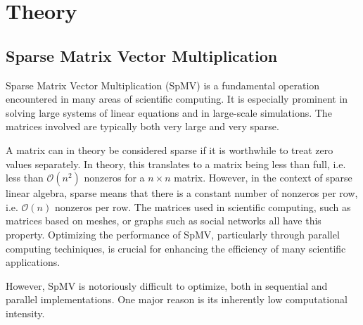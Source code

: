 
\chapter{Theory}

\section{Sparse Matrix Vector Multiplication}
Sparse Matrix Vector Multiplication (SpMV) is a fundamental operation encountered in many areas of scientific computing. It is especially prominent in solving large systems of linear equations and in large-scale simulations. The matrices involved are typically both very large and very sparse. 

A matrix can in theory be considered sparse if it is worthwhile to treat zero values separately. In theory, this translates to a matrix being less than full, i.e. less than \( \mathcal{O}\left(n^2\right)\) nonzeros for a \(n \times  n\) matrix. However, in the context of sparse linear algebra, sparse means that there is a constant number of nonzeros per row, i.e. \(\mathcal{O}\left(n\right)\) nonzeros per row. The matrices used in scientific computing, such as matrices based on meshes, or graphs such as social networks all have this property. Optimizing the performance of SpMV, particularly through parallel computing techiniques, is crucial for enhancing the efficiency of many scientific applications.

However, SpMV is notoriously difficult to optimize, both in sequential and parallel implementations. One major reason is its inherently low computational intensity.





